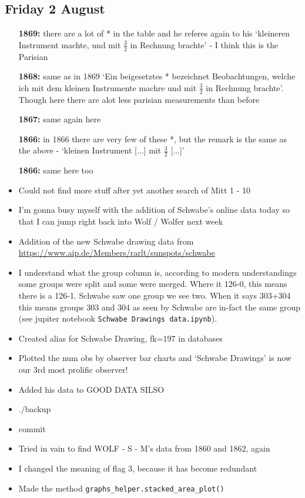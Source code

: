 \documentclass[12pt]{article}
\begin{document}
\subsection{Friday 2 August}
\begin{itemize}
    \item[\textbf{1869:}] there are a lot of * in the table and he referes again to his `kleineren Instrument machte, und mit $\frac{3}{2}$ in Rechnung brachte' - I think this is the Parisian
    \item[\textbf{1868:}] same as in 1869 `Ein beigesetztes * bezeichnet Beobachtungen, welche ich mit dem kleinen Instrumente machre und mit $\frac{3}{2}$ in Rechnung brachte'. Though here there are alot less parisian measurements than before
    \item[\textbf{1867:}] same again here
    \item[\textbf{1866:}] in 1866 there are very few of these *, but the remark is the same as the above - `kleinen Instrument [...] mit $\frac{3}{2}$ [...]'
    \item[\textbf{1866:}] same here too
    \item Could not find more stuff after yet another search of Mitt 1 - 10
    
    \item I'm gonna busy myself with the addition of Schwabe's online data today so that I can jump right back into Wolf / Wolfer next week
    \item Addition of the new Schwabe drawing data from \href{https://www.aip.de/Members/rarlt/sunspots/schwabe}{https://www.aip.de/Members/rarlt/sunspots/schwabe}
    
    \item I understand what the group column is, according to modern understandings some groups were split and some were merged. Where it 126-0, this means there is a 126-1. Schwabe saw one group we see two. When it says 303+304 this means groups 303 and 304 as seen by Schwabe are in-fact the same group (see jupiter notebook \texttt{Schwabe Drawings data.ipynb}).
    \item Created alias for Schwabe Drawing, fk=197 in databases
    \item Plotted the num obs by observer bar charts and `Schwabe Drawings' is now our 3rd most prolific observer!
    \item Added his data to GOOD DATA SILSO
    \item ./backup
    \item commit
    \item Tried in vain to find WOLF - S - M's data from 1860 and 1862, again 
    \item I changed the meaning of flag 3, because it has become redundant
    \item Made the method \texttt{graphs\_helper.stacked\_area\_plot()}
\end{itemize}
\end{document}
